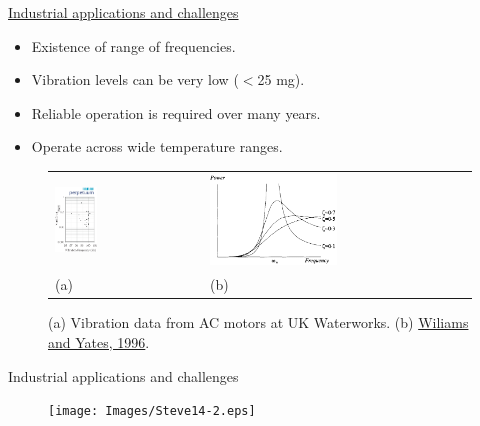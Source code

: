 \documentclass[LaTeX2e,10pt]{beamer}
\begin{document}
\begin{frame}{\href{https://eprints.soton.ac.uk/414732/}{Industrial applications and challenges}} 
\begin{itemize}
	\item Existence of range of frequencies.
	\item Vibration levels can be very low ($<$25 mg).
	\item Reliable operation is required over many years. 
	\item Operate across wide temperature ranges.
\end{itemize}
\vskip-20pt
\begin{figure}
\begin{tabular}{*{2}{p{}}}
    \includegraphics[width=0.3\textwidth]{Images/Steve11.eps}&\includegraphics[width=0.5\textwidth]{Images/WiliamsYates.png}\\
		(a) & (b) 
	\end{tabular}
	\caption{ (a) Vibration data from AC motors at UK Waterworks. (b) \href{https://www.sciencedirect.com/science/article/pii/092442479680118X}{Wiliams and Yates, 1996}.}
\end{figure}
\end{frame}
\begin{frame}{Industrial applications and challenges}
\begin{figure}
	\centering
	\texttt{[image: Images/Steve14-2.eps]}
\end{figure}
\end{frame}
\end{document}
